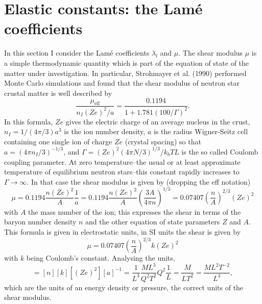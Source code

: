 \section{Elastic constants: the Lam\'e coefficients}
In this section I consider the Lam\'e coefficients $\lambda_l$ and $\mu$. The shear modulus $\mu$ is a simple thermodynamic quantity which is part of the equation of state of the matter under investigation. In particular, Strohmayer et al. (1990) performed Monte Carlo simulations and found that the shear modulus of neutron star crustal matter is well described by
\begin{equation}
\frac{\mu_\mathrm{eff}}{n_I(Ze)^2/a} = \frac{0.1194}{1 + 1.781(100/\Gamma)^2}.
\label{eq:strohmayerMu}
\end{equation}
In this formula, $Ze$ gives the electric charge of an average nucleus in the crust, $n_I=1/(4\pi/3)a^3$ is the ion number density, $a$ is the radius Wigner-Seitz cell containing one single ion of charge $Ze$ (crystal spacing) so that $a=(4\pi n_I/3)^{-1/3}$, and $\Gamma = (Ze)^2(4\pi N/3)^{1/3}/k_bTL$ is the so called Coulomb coupling parameter. At zero temperature--the usual or at least approximate temperature of equilibrium neutron stars--this constant rapidly increases to $\Gamma \rightarrow \infty$. In that case the shear modulus is given by (dropping the eff notation)
\begin{equation}
\mu = 0.1194\frac{n(Ze)^2}{A}\frac{1}{a} = 0.1194\frac{n(Ze)^2}{A}\left(\frac{3A}{4\pi n}\right)^{1/3}=0.07407\left(\frac{n}{A}\right)^{2/3}(Ze)^2
\label{eq:zeroTemperatureShearESU}
\end{equation}
with $A$ the mass number of the ion; this expresses the shear in terms of the baryon number density $n$ and the other equation of state parameters $Z$ and $A$. This formula is given in electrostatic units, in SI units the shear is given by
\begin{equation}
\mu = 0.07407\left(\frac{n}{A}\right)^{2/3}k(Ze)^2
\label{eq:zeroTemperatureShear}
\end{equation}
with $k$ being Coulomb's constant. Analysing the units,
\begin{equation}
[\mu] = [n][k][(Ze)^2][a]^{-1} = \frac{1}{L^3}\frac{ML^3}{Q^2T^2}Q^2\frac{1}{L} = \frac{M}{LT^2} = \frac{ML^2T^{-2}}{L^3},
\label{eq:shearDimension}
\end{equation}
which are the units of an energy density or pressure, the correct units of the shear modulus.

